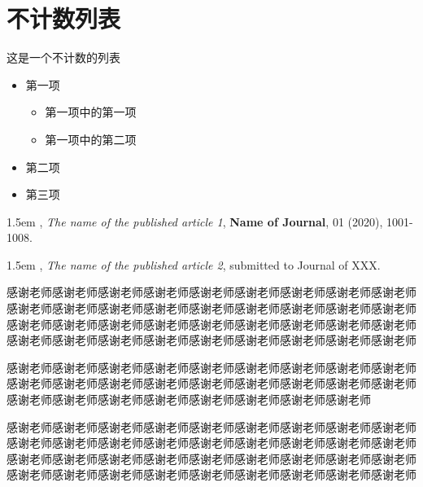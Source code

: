 \documentclass{shnuthesis}
\begin{document}
\section{不计数列表}

这是一个不计数的列表
\begin{itemize}
	\item 第一项
	\begin{itemize}
		\item 第一项中的第一项
		\item 第一项中的第二项
	\end{itemize}
	\item 第二项
	\item 第三项
\end{itemize}


\backmatter  %


\nocite{*}  %





\begin{researchpage}

\hangindent 1.5em
,  {\em The name of the published article 1}, {\bf Name of Journal}, 01 (2020), 1001-1008.

\hangindent 1.5em
,  {\em The name of the published article 2}, submitted to
Journal of XXX.



\end{researchpage}




\begin{thankpage}
\setlength{\baselineskip}{24pt}

感谢老师感谢老师感谢老师感谢老师感谢老师感谢老师感谢老师感谢老师感谢老师感谢老师感谢老师感谢老师感谢老师感谢老师感谢老师感谢老师感谢老师感谢老师感谢老师感谢老师感谢老师感谢老师感谢老师感谢老师感谢老师感谢老师感谢老师感谢老师感谢老师感谢老师感谢老师感谢老师感谢老师感谢老师感谢老师感谢老师

感谢老师感谢老师感谢老师感谢老师感谢老师感谢老师感谢老师感谢老师感谢老师感谢老师感谢老师感谢老师感谢老师感谢老师感谢老师感谢老师感谢老师感谢老师感谢老师感谢老师感谢老师感谢老师感谢老师感谢老师感谢老师感谢老师

感谢老师感谢老师感谢老师感谢老师感谢老师感谢老师感谢老师感谢老师感谢老师感谢老师感谢老师感谢老师感谢老师感谢老师感谢老师感谢老师感谢老师感谢老师感谢老师感谢老师感谢老师感谢老师感谢老师感谢老师感谢老师感谢老师感谢老师感谢老师感谢老师感谢老师感谢老师感谢老师感谢老师感谢老师感谢老师感谢老师

\end{thankpage}
\end{document}
